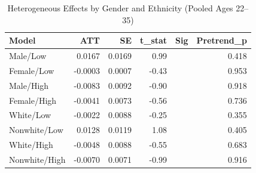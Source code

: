 \begin{table}[ht]
\centering
\begin{tabular}{lrrrlr}
  \toprule
Model & ATT & SE & t\_stat & Sig & Pretrend\_p \\ 
  \midrule
Male/Low & 0.0167 & 0.0169 & 0.99 &  & 0.418 \\ 
  Female/Low & -0.0003 & 0.0007 & -0.43 &  & 0.953 \\ 
  Male/High & -0.0083 & 0.0092 & -0.90 &  & 0.918 \\ 
  Female/High & -0.0041 & 0.0073 & -0.56 &  & 0.736 \\ 
  White/Low & -0.0022 & 0.0088 & -0.25 &  & 0.355 \\ 
  Nonwhite/Low & 0.0128 & 0.0119 & 1.08 &  & 0.405 \\ 
  White/High & -0.0048 & 0.0088 & -0.55 &  & 0.683 \\ 
  Nonwhite/High & -0.0070 & 0.0071 & -0.99 &  & 0.916 \\ 
   \bottomrule
\end{tabular}
\caption{Heterogeneous Effects by Gender and Ethnicity (Pooled Ages 22--35)} 
\label{tab:heterogeneity}
\end{table}
